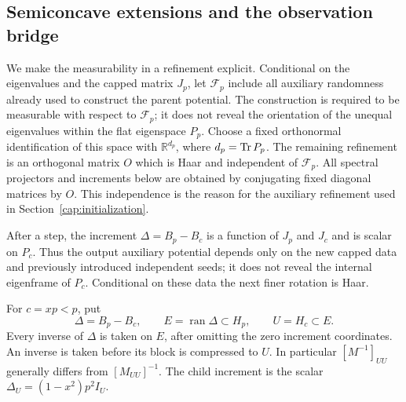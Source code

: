 \subsection{Semiconcave extensions and the observation bridge}
We make the measurability in a refinement explicit. Conditional on the
eigenvalues and the capped matrix $J_p$, let $\mathscr F_p$ include all
auxiliary randomness already used to construct the parent potential. The
construction is required to be measurable with respect to $\mathscr F_p$;
it does not reveal the orientation of the unequal eigenvalues within the
flat eigenspace $P_p$. Choose a fixed orthonormal identification of this space
with $\mathbb R^{d_p}$, where $d_p=\operatorname{Tr} P_p$. The remaining refinement is an
orthogonal matrix $O$ which is Haar and independent of $\mathscr F_p$.
All spectral projectors and increments below are obtained by conjugating
fixed diagonal matrices by $O$. This independence is the reason for the
auxiliary refinement used in Section~\ref{cap:initialization}.

After a step, the increment $\Delta=B_p-B_c$ is a function of $J_p$ and $J_c$
and is scalar on $P_c$. Thus the output auxiliary potential depends only on
the new capped data and previously introduced independent seeds; it does not
reveal the internal eigenframe of $P_c$. Conditional on these data the next
finer rotation is Haar.

For \(c=xp<p\), put
\[
 \Delta=B_p-B_c,\qquad E=\operatorname{ran}\Delta\subset H_p,\qquad
 U=H_c\subset E.
\]
Every inverse of \(\Delta\) is taken on \(E\), after omitting the zero
increment coordinates. An inverse is taken before its block is compressed
to \(U\). In particular \([M^{-1}]_{UU}\) generally differs from
\([M_{UU}]^{-1}\). The child increment is the scalar
\(\Delta_U=(1-x^2)p^2I_U\).

